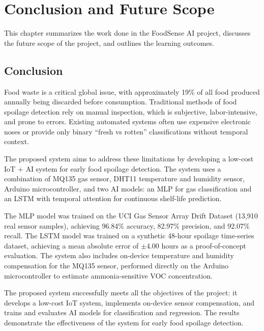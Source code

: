 \chapter{Conclusion and Future Scope}
This chapter summarizes the work done in the FoodSense AI project, discusses the future scope of the project, and outlines the learning outcomes.

\section{Conclusion}
Food waste is a critical global issue, with approximately 19\% of all food produced annually being discarded before consumption. Traditional methods of food spoilage detection rely on manual inspection, which is subjective, labor-intensive, and prone to errors. Existing automated systems often use expensive electronic noses or provide only binary ``fresh vs rotten'' classifications without temporal context.

The proposed system aims to address these limitations by developing a low-cost IoT + AI system for early food spoilage detection. The system uses a combination of MQ135 gas sensor, DHT11 temperature and humidity sensor, Arduino microcontroller, and two AI models: an MLP for gas classification and an LSTM with temporal attention for continuous shelf-life prediction.

The MLP model was trained on the UCI Gas Sensor Array Drift Dataset (13,910 real sensor samples), achieving 96.84\% accuracy, 82.97\% precision, and 92.07\% recall. The LSTM model was trained on a synthetic 48-hour spoilage time-series dataset, achieving a mean absolute error of $\pm$4.00 hours as a proof-of-concept evaluation. The system also includes on-device temperature and humidity compensation for the MQ135 sensor, performed directly on the Arduino microcontroller to estimate ammonia-sensitive VOC concentration.

The proposed system successfully meets all the objectives of the project: it develops a low-cost IoT system, implements on-device sensor compensation, and trains and evaluates AI models for classification and regression. The results demonstrate the effectiveness of the system for early food spoilage detection.

